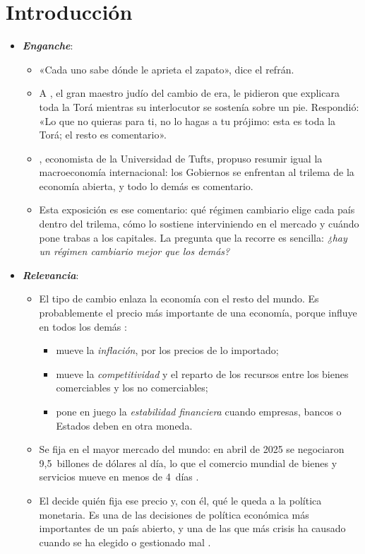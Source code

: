 \documentclass[11pt]{article}
\begin{document}
\tceetitulo

\section*{Introducción}

\begin{itemize}
\item \textbf{\emph{Enganche}}:
  \begin{itemize}
  \item «Cada uno sabe dónde le aprieta el zapato», dice el refrán.
  \item A , el gran maestro judío del cambio de era, le pidieron que explicara toda la Torá mientras su interlocutor se sostenía sobre un pie. Respondió: «Lo que no quieras para ti, no lo hagas a tu prójimo: esta es toda la Torá; el resto es comentario».
  \item {}, economista de la Universidad de Tufts, propuso resumir igual la macroeconomía internacional: los Gobiernos se enfrentan al trilema de la economía abierta, y todo lo demás es comentario\nocite{Economist2016Trilema}.
  \item Esta exposición es ese comentario: qué régimen cambiario elige cada país dentro del trilema, cómo lo sostiene interviniendo en el mercado y cuándo pone trabas a los capitales. La pregunta que la recorre es sencilla: \emph{¿hay un régimen cambiario mejor que los demás?}
  \end{itemize}

\item \textbf{\emph{Relevancia}}:
  \begin{itemize}
  \item El tipo de cambio enlaza la economía con el resto del mundo. Es probablemente el precio más importante de una economía, porque influye en todos los demás :
    \begin{itemize}
    \item mueve la \emph{inflación}, por los precios de lo importado;
    \item mueve la \emph{competitividad} y el reparto de los recursos entre los bienes comerciables y los no comerciables;
    \item pone en juego la \emph{estabilidad financiera} cuando empresas, bancos o Estados deben en otra moneda.
    \end{itemize}
  \item Se fija en el mayor mercado del mundo: en abril de 2025 se negociaron 9,5~billones de dólares al día\nocite{BIS2026TrienalDatos}, lo que el comercio mundial de bienes y servicios mueve en menos de 4~días\nocite{OMC2026GTOS} .
  \item El  decide quién fija ese precio y, con él, qué le queda a la política monetaria. Es una de las decisiones de política económica más importantes de un país abierto, y una de las que más crisis ha causado cuando se ha elegido o gestionado mal .
  \end{itemize}


\end{itemize}
\end{document}
